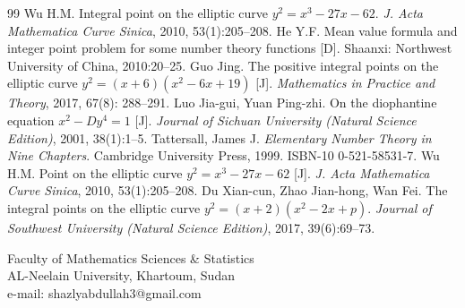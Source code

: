 \documentclass[11pt]{amsart}
\begin{document}
\begin{thebibliography}{99}
 Wu H.M. Integral point on the elliptic curve $y^2=x^3-27x-62$. \emph{J. Acta Mathematica Curve Sinica}, 2010, 53(1):205--208.
 He Y.F. Mean value formula and integer point problem for some number theory functions [D]. Shaanxi: Northwest University of China, 2010:20--25.
 Guo Jing. The positive integral points on the elliptic curve $y^2=(x+6)(x^2-6x+19)$ [J]. \emph{Mathematics in Practice and Theory}, 2017, 67(8): 288--291.
 Luo Jia-gui, Yuan Ping-zhi. On the diophantine equation $x^2-Dy^4=1$ [J]. \emph{Journal of Sichuan University (Natural Science Edition)}, 2001, 38(1):1--5.
 Tattersall, James J. \emph{Elementary Number Theory in Nine Chapters}. Cambridge University Press, 1999. ISBN-10 0-521-58531-7.
 Wu H.M. Point on the elliptic curve $y^2=x^3-27x-62$ [J]. \emph{J. Acta Mathematica Curve Sinica}, 2010, 53(1):205--208.
 Du Xian-cun, Zhao Jian-hong, Wan Fei. The integral points on the elliptic curve $y^2=(x+2)(x^2-2x+p)$. \emph{Journal of Southwest University (Natural Science Edition)}, 2017, 39(6):69--73.
\end{thebibliography}

\vspace{1em}
\noindent Faculty of Mathematics Sciences \& Statistics\\
AL-Neelain University, Khartoum, Sudan\\
e-mail: shazlyabdullah3@gmail.com
\end{document}
